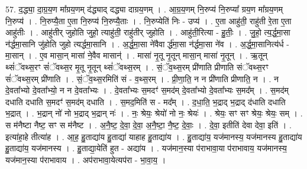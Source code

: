 \documentclass[17pt]{extarticle}
\begin{document}
57. द॒द्ध्या॒ दा॒ग्र॒य॒ण मा᳚ग्रय॒णम् द॑द्ध्याद् दद्ध्या दाग्रय॒णम् । . आ॒ग्र॒य॒णम् नि॒रुप्य॑ नि॒रुप्या᳚ ग्रय॒ण मा᳚ग्रय॒णम् नि॒रुप्य॑ । . नि॒रुप्यै॒ता ए॒ता नि॒रुप्य॑ नि॒रुप्यै॒ताः । . नि॒रुप्येति॑ निः - उप्य॑ । . ए॒ता आहु॑ती॒ राहु॑ती रे॒ता ए॒ता आहु॑तीः । . आहु॑तीर् जुहोति जुहो॒ त्याहु॑ती॒ राहु॑तीर् जुहोति । . आहु॑ती॒रित्या - हु॒तीः॒ । . जु॒हो॒ त्य॒र्द्ध॒मा॒सा न॑र्द्धमा॒सानि जु॑होति जुहो त्यर्द्धमा॒सानि । . अ॒र्द्ध॒मा॒सा ने॑वैवा र्द्ध॑मा॒सा न॑र्द्धमा॒सा ने॑व । . अ॒र्द्ध॒मा॒सानित्य॑र्ध - मा॒सान् । . ए॒व मासा॒न् मासा॑ ने॒वैव मासान्॑ । . मासा॑ नृ॒तू नृ॒तून् मासा॒न् मासा॑ नृ॒तून् । . ऋ॒तून् थ्सं॑ॅवथ्स॒रꣳ सं॑ॅवथ्स॒र मृ॒तू नृ॒तून् थ्सं॑ॅवथ्स॒रम् । . सं॒ॅव॒थ्स॒रम् प्री॑णाति प्रीणाति संॅवथ्स॒रꣳ सं॑ॅवथ्स॒रम् प्री॑णाति । . सं॒ॅव॒थ्स॒रमिति॑ सं - व॒थ्स॒रम् । . प्री॒णा॒ति॒ न न प्री॑णाति प्रीणाति॒ न । . न दे॒वता᳚भ्यो दे॒वता᳚भ्यो॒ न न दे॒वता᳚भ्यः । . दे॒वता᳚भ्यः स॒मदꣳ॑ स॒मद॑म् दे॒वता᳚भ्यो दे॒वता᳚भ्यः स॒मद᳚म् । . स॒मद॑म् दधाति दधाति स॒मदꣳ॑ स॒मद॑म् दधाति । . स॒मद॒मिति॑ स - मद᳚म् । . द॒धा॒ति॒ भ॒द्राद् भ॒द्राद् द॑धाति दधाति भ॒द्रात् । . भ॒द्रान् नो॑ नो भ॒द्राद् भ॒द्रान् नः॑ । . नः॒ श्रेयः॒ श्रेयो॑ नो नः॒ श्रेयः॑ । . श्रेयः॒ सꣳ सꣳ श्रेयः॒ श्रेयः॒ सम् । . स म॑नैष्टा नैष्ट॒ सꣳ स म॑नैष्ट । . अ॒नै॒ष्ट॒ दे॒वा॒ दे॒वा॒ अ॒नै॒ष्टा॒ नै॒ष्ट॒ दे॒वाः॒ । . दे॒वा॒ इतीति॑ देवा देवा॒ इति॑ । . इत्या॑हा॒हे तीत्या॑ह । . आ॒ह॒ हु॒ताद्या॑य हु॒ताद्या॑ याहाह हु॒ताद्या॑य । . हु॒ताद्या॑य॒ यज॑मानस्य॒ यज॑मानस्य हु॒ताद्या॑य हु॒ताद्या॑य॒ यज॑मानस्य । . हु॒ताद्या॒येति॑ हुत - अद्या॑य । . यज॑मान॒स्या प॑राभावा॒या प॑राभावाय॒ यज॑मानस्य॒ यज॑मान॒स्या प॑राभावाय । . अप॑राभावा॒येत्यप॑रा - भा॒वा॒य॒ । \newline
\end{document}

